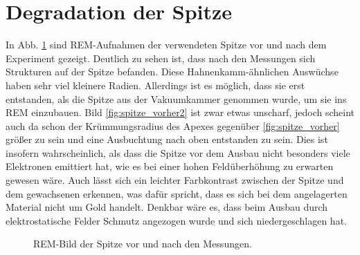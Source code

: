 \documentclass[bachelor,       %
               twoside,        %
               BCOR10mm,       %
               english,ngerman, %
               ]{GAUBM}
\begin{document}
\section{Degradation der Spitze}
In Abb. \ref{fig:rem} sind REM-Aufnahmen der verwendeten Spitze vor und nach dem Experiment gezeigt.
Deutlich zu sehen ist, dass nach den Messungen sich Strukturen auf der Spitze befanden.
Diese Hahnenkamm-ähnlichen Auswüchse haben sehr viel kleinere Radien.
Allerdings ist es möglich, dass sie erst entstanden, als die Spitze aus der Vakuumkammer genommen wurde, um sie ins REM einzubauen.
Bild \ref{fig:spitze_vorher2} ist zwar etwas unscharf, jedoch scheint auch da schon der Krümmungsradius des Apexes gegenüber \ref{fig:spitze_vorher} größer zu sein und eine Ausbuchtung nach oben entstanden zu sein.
Dies ist insofern wahrscheinlich, als dass die Spitze vor dem Ausbau nicht besonders viele Elektronen emittiert hat, wie es bei einer hohen Feldüberhöhung zu erwarten gewesen wäre.
Auch lässt sich ein leichter Farbkontrast zwischen der Spitze und dem gewachsenen erkennen, was dafür spricht, dass es sich bei dem angelagerten Material nicht um Gold handelt.
Denkbar wäre es, dass beim Ausbau durch elektrostatische Felder Schmutz angezogen wurde und sich niedergeschlagen hat.

\begin{figure}[h!]
  \centering
  \hfill
  \hfill
  \caption{REM-Bild der Spitze vor und nach den Messungen.}
  \label{fig:rem}
\end{figure}
\end{document}
